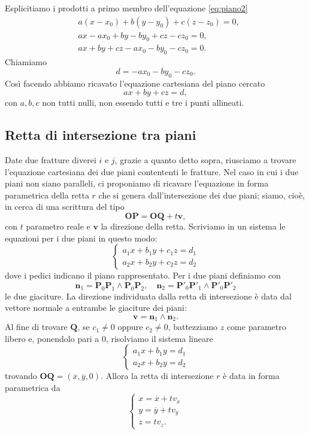 \documentclass[a4paper]{article}
\newcommand{\B}{\mathbf}
\begin{document}
Esplicitiamo i prodotti a primo membro dell'equazione \eqref{eq:piano2} 
\[
\begin{aligned}
& a\left(x-x_0\right)+b\left(y-y_0\right)+c\left(z-z_0\right)=0, \\
& a x-a x_0+b y-b y_0+c z-c z_0=0, \\
& a x+b y+c z-a x_0-b y_0-c z_0=0.
\end{aligned}
\]
Chiamiamo
$$
d=-a x_0-b y_0-c z_0.
$$ 
Così facendo abbiamo ricavato l'equazione cartesiana del piano cercato 
$$
ax+by+cz=d,
$$ 
con $a,b,c$ non tutti nulli, non essendo tutti e tre i punti allineati.

\subsection{Retta di intersezione tra piani}
Date due fratture diverei $i$ e $j$, grazie a quanto detto sopra, riusciamo a trovare l'equazione cartesiana dei due piani contententi le fratture. Nel caso in cui i due piani non siano paralleli, ci proponiamo di ricavare l'equazione in forma parametrica della retta $r$ che si genera dall'intersezione dei due piani; siamo, cioè, in cerca di una scrittura del tipo $$\B{OP}=\B{OQ}+t\B{v},$$ con $t$ parametro reale e $\B{v}$ la direzione della retta. Scriviamo in un sistema le equazioni per i due piani in questo modo: 
$$
\begin{cases}
a_1x+b_1y+c_1z=d_1\\ 
a_2x+b_2y+c_2z=d_2
\end{cases}
$$ 
dove i pedici indicano il piano rappresentato. Per i due piani definiamo con 
$$
\B{n}_1=\B{P}_0\B{P}_1\wedge \B{P}_0\B{P}_2,\quad \B{n}_2 = \B{P}'_0\B{P}'_1\wedge \B{P}'_0\B{P}'_2
$$ 
le due giaciture. La direzione individuata dalla retta di intersezione è data dal vettore normale a entrambe le giaciture dei piani: 
$$
\B{v}=\B{n}_1\wedge \B{n}_2.
$$ 
Al fine di trovare $\B{Q}$, se $c_1\neq 0$ oppure $c_2\neq0$, battezziamo $z$ come parametro libero e, ponendolo pari a $0$, risolviamo il sistema lineare 
$$
\begin{cases}
a_1x+b_1y=d_1\\ 
a_2x+b_2y=d_2
\end{cases}
$$ 
trovando $\B{OQ}=(\overline{x},\overline{y},0)$. Allora la retta di intersezione $r$ è data in forma parametrica da 
$$
\begin{cases}
x=\overline{x}+tv_x \\ 
y=\overline{y}+tv_y \\ 
z=tv_z.
\end{cases}
$$
\end{document}
